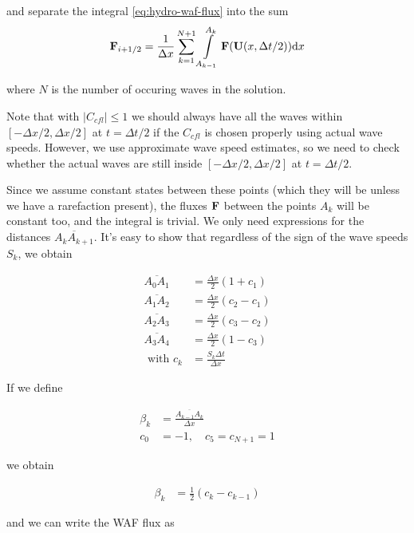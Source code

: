and separate the integral \ref{eq:hydro-waf-flux} into the sum
\begin{align}
\F_{i + \half} = \frac{1}{\Delta x} \sum\limits_{k = 1}^{N+1} \int\limits_{A_{k-1}}^{A_k} \F (\U(x, \Delta t / 2)) \de x
\end{align}

where $N$ is the number of occuring waves in the solution.





Note that with $|C_{cfl}| \leq 1$ we should always have all the waves within $[-\Delta x /2, \Delta x / 2]$ at $t = \Delta t / 2$ if the $C_{cfl}$ is chosen properly using actual wave speeds.
However, we use approximate wave speed estimates, so we need to check whether the actual waves are still inside $[-\Delta x /2, \Delta x / 2]$ at $t = \Delta t / 2$.



Since we assume constant states between these points (which they will be unless we have a rarefaction present), the fluxes $\mathbf{F}$ between the points $A_k$ will be constant too, and the integral is trivial.
We only need expressions for the distances $\overline{A_{k}A_{k+1}}$.
It's easy to show that regardless of the sign of the wave speeds $S_k$, we obtain

\begin{align*}
	\overline{A_0 A_1} &= 
		\frac{\Delta x}{2} ( 1 + c_1 ) \\
	\overline{A_1 A_2} &= 
		\frac{\Delta x}{2} ( c_2 - c_1 ) \\
	\overline{A_2 A_3} &= 
		\frac{\Delta x}{2} ( c_3 - c_2 ) \\
	\overline{A_3 A_4} &= 
		\frac{\Delta x}{2} ( 1 - c_3 ) \\ 
	\text{ with } c_k &= \frac{S_k \Delta t}{\Delta x}
\end{align*}



If we define

\begin{align*}
	\beta_k &= \frac{\overline{A_{k-1} A_k}}{\Delta x}\\
	c_0 &= -1, \quad c_5 = c_{N+1} = 1
\end{align*}

we obtain

\begin{align*}
	\beta_k &= \frac{1}{2} (c_k - c_{k-1})
\end{align*}

and we can write the WAF flux as


